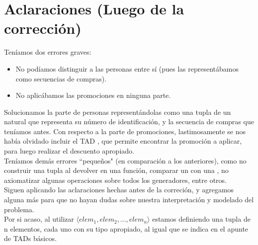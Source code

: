 \documentclass[10pt, a4paper]{article}
\renewcommand{\tadNombre}[1]{\text{\scshape{#1}}}
\begin{document}
{    %
}

\section{Aclaraciones (Luego de la corrección)} \label{Aclaraciones}{
\noindent Teníamos dos errores graves:
\begin{itemize}
    \item{No podíamos distinguir a las personas entre sí (pues las representábamos como secuencias de compras).}
    \item{No aplicábamos las promociones en ninguna parte.}
\end{itemize}

\noindent Solucionamos la parte de personas representándolas como una tupla de un natural que representa su número de identificación, y 
la secuencia de compras que teníamos antes. Con respecto a la parte de promociones, lastimosamente se nos había olvidado incluir el TAD \tadNombre{Promociones}, que permite encontrar la promoción a aplicar, para luego realizar el descuento apropiado.\\


\noindent Teníamos demás errores ``pequeños" (en comparación a los anteriores), como no construir una tupla al devolver en una función, comparar un \tadNombre{Nat} con una \tadNombre{Compra}, no axiomatizar algunas operaciones sobre todos los generadores, entre otros.\\


\noindent Siguen aplicando las aclaraciones hechas antes de la correción, y agregamos alguna más para que no hayan dudas sobre nuestra interpretación y modelado del problema.\\

\noindent Por si acaso, al utilizar $\langle elem_1, elem_2, ..., elem_n \rangle$ estamos definiendo una tupla de n elementos, cada uno
con su tipo apropiado, al igual que se indica en el apunte de TADs básicos.

}
\end{document}
